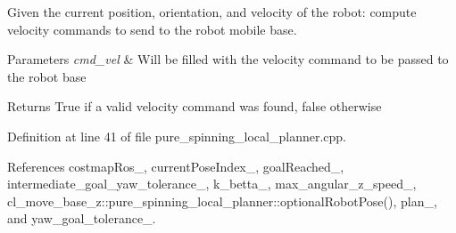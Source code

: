Given the current position, orientation, and velocity of the robot\+: compute velocity commands to send to the robot mobile base. 


\begin{DoxyParams}{Parameters}
{\em cmd\+\_\+vel} & Will be filled with the velocity command to be passed to the robot base \\
\hline
\end{DoxyParams}
\begin{DoxyReturn}{Returns}
True if a valid velocity command was found, false otherwise 
\end{DoxyReturn}


Definition at line 41 of file pure\+\_\+spinning\+\_\+local\+\_\+planner.\+cpp.



References costmap\+Ros\+\_\+, current\+Pose\+Index\+\_\+, goal\+Reached\+\_\+, intermediate\+\_\+goal\+\_\+yaw\+\_\+tolerance\+\_\+, k\+\_\+betta\+\_\+, max\+\_\+angular\+\_\+z\+\_\+speed\+\_\+, cl\+\_\+move\+\_\+base\+\_\+z\+::pure\+\_\+spinning\+\_\+local\+\_\+planner\+::optional\+Robot\+Pose(), plan\+\_\+, and yaw\+\_\+goal\+\_\+tolerance\+\_\+.


